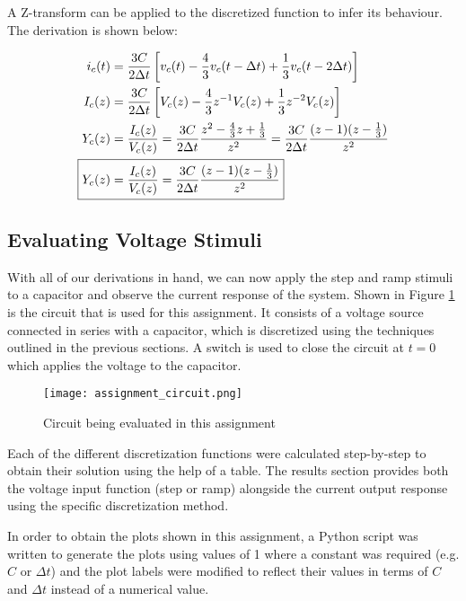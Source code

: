 \documentclass[10pt, oneside, letterpaper]{article}
\begin{document}
A Z-transform can be applied to the discretized function to infer its behaviour. The derivation is shown below:

\begin{alignat}{2}
  i_c(t) &= \frac{3C}{2\Delta{}t}\left[v_c(t) - \frac{4}{3}v_c(t-\Delta{}t) + \frac{1}{3}v_c(t-2\Delta{}t)\right] \\
  I_c(z) &= \frac{3C}{2\Delta{}t}\left[V_c(z) - \frac{4}{3}z^{-1}V_c(z) + \frac{1}{3}z^{-2}V_c(z)\right] \\
  Y_c(z) &= \frac{I_c(z)}{V_c(z)} = \frac{3C}{2{}\Delta{}t}\frac{z^{2} - \frac{4}{3}z + \frac{1}{3}}{z^{2}} = \frac{3C}{2\Delta{}t}\frac{(z - 1)(z - \frac{1}{3})}{z^{2}} \\
  \Aboxed{Y_c(z) &= \frac{I_c(z)}{V_c(z)} = \frac{3C}{2\Delta{}t}\frac{(z - 1)(z - \frac{1}{3})}{z^{2}}}
\end{alignat}

\subsection{Evaluating Voltage Stimuli}

With all of our derivations in hand, we can now apply the step and ramp stimuli to a capacitor and observe the current response of the system. Shown in Figure \ref{circuit} is the circuit that is used for this assignment. It consists of a voltage source connected in series with a capacitor, which is discretized using the techniques outlined in the previous sections. A switch is used to close the circuit at $t=0$ which applies the voltage to the capacitor.

\begin{figure}[H]
  \centering
  \texttt{[image: assignment\_circuit.png]}
  \caption{Circuit being evaluated in this assignment}
  \label{circuit}
\end{figure}

Each of the different discretization functions were calculated step-by-step to obtain their solution using the help of a table. The results section provides both the voltage input function (step or ramp) alongside the current output response using the specific discretization method.

In order to obtain the plots shown in this assignment, a Python script was written to generate the plots using values of 1 where a constant was required (e.g. $C$ or $\Delta{}t$) and the plot labels were modified to reflect their values in terms of $C$ and $\Delta{}t$ instead of a numerical value.
\end{document}
